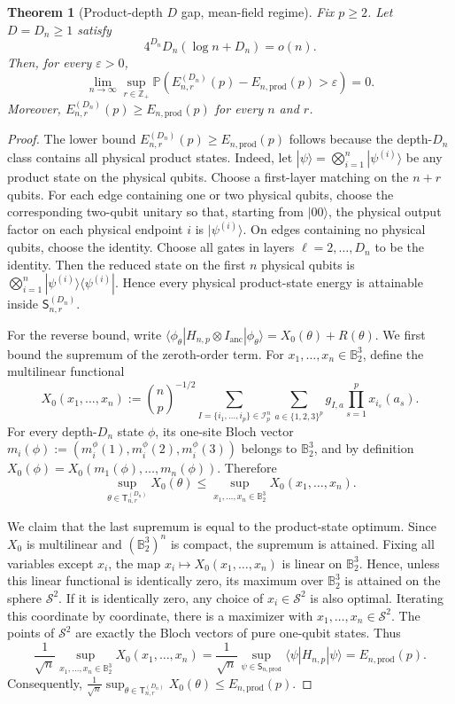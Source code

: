 \documentclass[12pt]{article}
\newtheorem{theorem}{Theorem}
\renewcommand{\P}{\mathbb{P}}
\newcommand{\B}{\mathbb{B}}
\newcommand{\mcI}{\mathcal{I}}
\newcommand{\mcS}{\mathcal{S}}
\begin{document}
\begin{theorem}[Product-depth $D$ gap, mean-field regime]
\label{thm:log-depth-product-gap-residual}
Fix \(p\ge 2\). Let \(D=D_n\ge 1\) satisfy
\[
4^{D_n}D_n(\log n+D_n)=o(n).
\]
Then, for every \(\varepsilon>0\),
\[
\lim_{n\to\infty}
\sup_{r\in\mathbb Z_+}
\P\left(
    E_{n,r}^{(D_n)}(p)-E_{n,\mathrm{prod}}(p)>\varepsilon
\right)
=0.
\]
Moreover, $E_{n,r}^{(D_n)}(p)\ge E_{n,\mathrm{prod}}(p)$ for every \(n\) and \(r\).
\end{theorem}

\begin{proof}
The lower bound \(E_{n,r}^{(D_n)}(p)\ge E_{n,\mathrm{prod}}(p)\) follows because
the depth-\(D_n\) class contains all physical product states. Indeed, let $|\psi\rangle=\bigotimes_{i=1}^n|\psi^{(i)}\rangle$ be any product state on the physical qubits. Choose a first-layer matching on the \(n+r\) qubits. For each edge containing one or two physical qubits, choose the corresponding two-qubit unitary so that, starting from \(|00\rangle\), the
physical output factor on each physical endpoint \(i\) is
\(|\psi^{(i)}\rangle\). On edges containing no physical qubits, choose the
identity. Choose all gates in layers \(\ell=2,\dots,D_n\) to be the identity.
Then the reduced state on the first \(n\) physical qubits is $\bigotimes_{i=1}^n|\psi^{(i)}\rangle\langle\psi^{(i)}|$. Hence every physical product-state energy is attainable inside
\(\mathsf{S}_{n,r}^{(D_n)}\).

For the reverse bound, write $\langle \phi_\theta|H_{n,p} \otimes I_{\mathrm{anc}}|\phi_\theta \rangle = X_0(\theta) + R(\theta)$. We first bound the supremum of the zeroth-order term. For \(x_1,\dots,x_n\in \B_2^3\), define
the multilinear functional
\[
X_0(x_1,\dots,x_n)
:=
\binom np^{-1/2}
\sum_{I=\{i_1,\dots,i_p\}\in\mcI_p^n}
\sum_{a\in\{1,2,3\}^p}
g_{I,a}
\prod_{s=1}^p x_{i_s}(a_s).
\]
For every depth-\(D_n\) state \(\phi\), its one-site Bloch vector $m_i(\phi)
:=(m_i^\phi(1),m_i^\phi(2),m_i^\phi(3))$ belongs to \(\B_2^3\), and by definition $X_0(\phi)
=
X_0(m_1(\phi),\dots,m_n(\phi))$. Therefore
\[
\sup_{\theta \in \mathsf{T}_{n,r}^{(D_n)}} X_0(\theta)
\le
\sup_{x_1,\dots,x_n\in \B_2^3}
X_0(x_1,\dots,x_n).
\]

We claim that the last supremum is equal to the product-state optimum. Since
\(X_0\) is multilinear and \((\B_2^3)^n\) is compact, the supremum is attained.
Fixing all variables except \(x_i\), the map $x_i\mapsto X_0(x_1,\dots,x_n)$
is linear on \(\B_2^3\). Hence, unless this linear functional is identically
zero, its maximum over \(\B_2^3\) is attained on the sphere \(\mcS^2\). If it is
identically zero, any choice of \(x_i\in \mcS^2\) is also optimal. Iterating this
coordinate by coordinate, there is a maximizer with $x_1,\dots,x_n\in \mcS^2.$ The points of \(\mcS^2\) are exactly the Bloch vectors of pure one-qubit states.
Thus
\[
\frac1{\sqrt n}
\sup_{x_1,\dots,x_n\in \B_2^3}
X_0(x_1,\dots,x_n)
=
\frac1{\sqrt n}
\sup_{\psi\in \mathsf{S}_{n,\mathrm{prod}}}
\langle \psi|H_{n,p}|\psi\rangle
=
E_{n,\mathrm{prod}}(p).
\]
Consequently, $ \frac{1}{\sqrt{n}} \sup_{\theta \in \mathsf{T}_{n,r}^{(D_n)}} X_0(\theta) \le E_{n,\mathrm{prod}}(p)$.


\end{proof}
\end{document}
